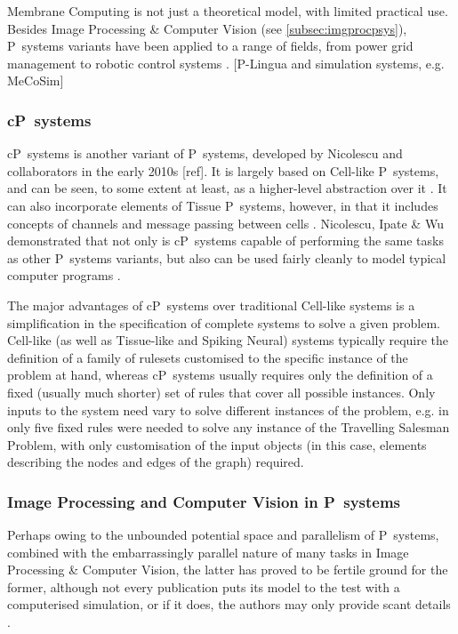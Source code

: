 Membrane Computing is not just a theoretical model, with limited practical use.  Besides Image Processing \& Computer Vision (see \autoref{subsec:imgprocpsys}), P~systems variants have been applied to a range of fields, from power grid management to robotic control systems \cite{Zhang2017}.  [P-Lingua and simulation systems, e.g. MeCoSim]

\subsubsection{\label{subsec:cpsys}cP~systems}
\cite{Nicolescu2014b,Nicolescu2017}

cP~systems is another variant of P~systems, developed by Nicolescu and collaborators in the early 2010s [ref].  It is largely based on Cell-like P~systems, and can be seen, to some extent at least, as a higher-level abstraction over it \cite{Nicolescu2018}.  It can also incorporate elements of Tissue P~systems, however, in that it includes concepts of channels and message passing between cells \cite{Henderson2019}.  Nicolescu, Ipate \& Wu demonstrated that not only is cP~systems capable of performing the same tasks as other P~systems variants, but also can be used fairly cleanly to model typical computer programs \cite{Nicolescu2014a}.

The major advantages of cP~systems over traditional Cell-like systems is a simplification in the specification of complete systems to solve a given problem.  Cell-like (as well as Tissue-like and Spiking Neural) systems typically require the definition of a family of rulesets customised to the specific instance of the problem at hand, whereas cP~systems usually requires only the definition of a fixed (usually much shorter) set of rules that cover all possible instances.  Only inputs to the system need vary to solve different instances of the problem, e.g. in \cite{Cooper2019} only five fixed rules were needed to solve any instance of the Travelling Salesman Problem, with only customisation of the input objects (in this case, elements describing the nodes and edges of the graph) required.



\subsubsection{\label{subsec:imgprocpsys}Image Processing and Computer Vision in P~systems}
\cite{Zhang2012}

Perhaps owing to the unbounded potential space and parallelism of P~systems, combined with the embarrassingly parallel nature of many tasks in Image Processing \& Computer Vision, the latter has proved to be fertile ground for the former, although not every publication puts its model to the test with a computerised simulation, or if it does, the authors may only provide scant details \cite{Diaz-Pernil2019}.  

